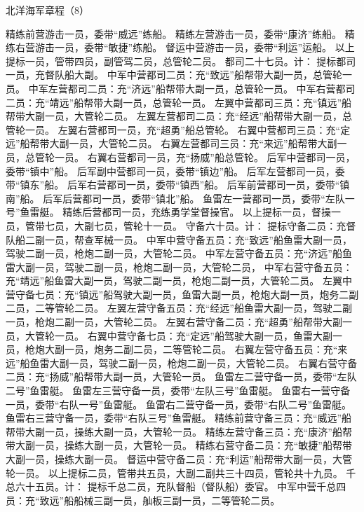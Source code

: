 \documentclass[12pt,UTF8]{ctexbook}
\begin{document}
北洋海军章程（8）

精练前营游击一员，委带“威远”练船。
精练左营游击一员，委带“康济”练船。
精练右营游击一员，委带“敏捷”练船。
督运中营游击一员，委带“利运”运船。
以上提标一员，管带四员，副管驾二员，总管轮二员。
都司二十七员。计：
提标都司一员，充督队船大副。
中军中营都司二员：充“致远”船帮带大副一员，总管轮一员。
中军左营都司二员：充“济远”船帮带大副一员，总管轮一员。
中军右营都司二员：充“靖远”船帮带大副一员，总管轮一员。
左翼中营都司三员：充“镇远”船帮带大副一员，大管轮二员。
左翼左营都司二员：充“经远”船帮带大副一员，总管轮一员。
左翼右营都司一员，充“超勇”船总管轮。
右翼中营都司三员：充“定远”船帮带大副一员，大管轮二员。
右翼左营都司三员：充“来远”船帮带大副一员，总管轮一员。
右翼右营都司一员，充“扬威”船总管轮。
后军中营都司一员，委带“镇中”船。
后军副中营都司一员，委带“镇边”船。
后军左营都司一员，委带“镇东”船。
后军右营都司一员，委带“镇西”船。
后军前营都司一员，委带“镇南”船。
后军后营都司一员，委带“镇北”船。
鱼雷左一营都司一员，委带“左队一号”鱼雷艇。
精练后营都司一员，充练勇学堂督操官。
以上提标一员，督操一员，管带七员，大副七员，管轮十一员。
守备六十员。计：
提标守备二员：充督队船二副一员，帮查军械一员。
中军中营守备五员：充“致远”船鱼雷大副一员，驾驶二副一员，枪炮二副一员，大管轮二员。
中军左营守备五员：充“济远”船鱼雷大副一员，驾驶二副一员，枪炮二副一员，大管轮二员，
中军右营守备五员：充“靖远”船鱼雷大副一员，驾驶二副一员，枪炮二副一员，大管轮二员。
左翼中营守备七员：充“镇远”船驾驶大副一员，鱼雷大副一员，枪炮大副一员，炮务二副二员，二等管轮二员。
左翼左营守备五员：充“经远”船鱼雷大副一员，驾驶二副一员，枪炮二副一员，大管轮二员。
左翼右营守备二员：充“超勇”船帮带大副一员，大管轮一员。
右翼中营守备七员：充“定远”船驾驶大副一员，鱼雷大副一员，枪炮大副一员，炮务二副二员，二等管轮二员。
右翼左营守备五员：充“来远”船鱼雷大副一员，驾驶二副一员，枪炮二副一员，大管轮二员。
右翼右营守备二员：充“扬威”船帮带大副一员，大管轮一员。
鱼雷左二营守备一员，委带“左队二号”鱼雷艇。
鱼雷左三营守备一员，委带“左队三号”鱼雷艇。
鱼雷右一营守备一员，委带“右队一号”鱼雷艇。
鱼雷右二营守备一员，委带“右队二号”鱼雷艇。
鱼雷右三营守备一员，委带“右队三号”鱼雷艇。
精练前营守备三员：充“威远”船帮带大副一员，操练大副一员，大管轮一员。
精练左营守备三员：充“康济”船帮带大副一员，操练大副一员，大管轮一员。
精练右营守备二员：充“敏捷”船帮带大副一员，操练大副一员。
督运中营守备二员：充“利运”船帮带大副一员，大管轮一员。
以上提标二员，管带共五员，大副二副共三十四员，管轮共十九员。
千总六十五员。计：
提标千总二员，充队督船（督队船）委官。
中军中营千总四员：充“致远”船船械三副一员，舢板三副一员，二等管轮二员。
\end{document}
